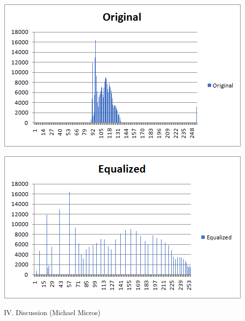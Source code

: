 \documentclass{article}
\newenvironment{Figure}
  {\par\medskip\noindent\ignorespaces\minipage{\linewidth}}
  {\endminipage\par\medskip}
\begin{document}
\begin{multicols*}{2}
\begin{Figure}
 \centering
 \includegraphics[width=\linewidth]{hist1.png}
\end{Figure}


\begin{Figure}
 \centering
 \includegraphics[width=\linewidth]{eqHist.png}
\end{Figure}


\vspace{15 pt}



\begin{center}
{\large IV. Discussion (Michael Micros)}
\end{center}


\end{multicols*}
\end{document}
